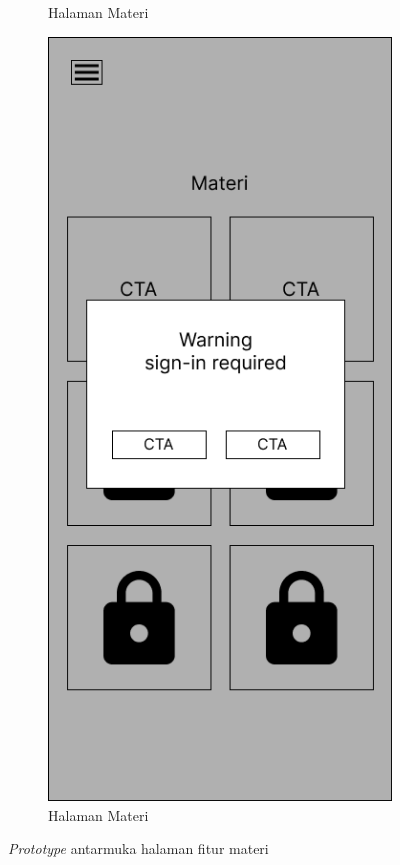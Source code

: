 \begin{figure}[H]
\begin{subfigure}[b]{0.3\textwidth}
	  \caption{Halaman Materi}
	  \label{fig:ActivityMateri3}
	\end{subfigure}
	\begin{subfigure}[b]{0.3\textwidth}
		\centering
	  \includegraphics[width=\linewidth]{contents/chapter-3/images/MF-materi-4.png}
	  \caption{Halaman Materi}
	  \label{fig:ActivityMateri}
	\end{subfigure}
	\caption{\textit{Prototype} antarmuka halaman fitur materi}
	\label{Fig:FeatureSetSubject}
\end{figure}
